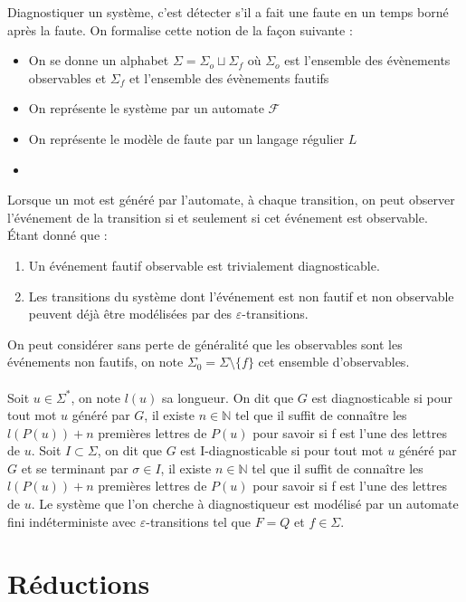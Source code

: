 \documentclass[10pt,a4paper]{article}
\begin{document}
Diagnostiquer un syst\`eme, c'est d\'etecter s'il a fait une faute en un temps born\'e apr\`es la faute. On formalise cette notion de la fa\c{c}on suivante :
\begin{itemize}
	\item On se donne un alphabet $\Sigma=\Sigma_o\sqcup\Sigma_f$ o\`u $\Sigma_o$ est l'ensemble des \'ev\`enements observables et $\Sigma_f$ et l'ensemble des \'ev\`enements fautifs
	\item On repr\'esente le syst\`eme par un automate $\mathcal F$
	\item On repr\'esente le mod\`ele de faute par un langage r\'egulier $L$
	\item 
\end{itemize}

Lorsque un mot est généré par l'automate, à chaque transition, on peut observer l’événement de la transition si et seulement si cet événement est observable. Étant donné que :
\begin{enumerate}
\item Un événement fautif observable est trivialement diagnosticable.
\item Les transitions du système dont l'événement est non fautif et non observable peuvent déjà être modélisées par des $\varepsilon$-transitions.
\end{enumerate} 
On peut considérer sans perte de généralité que les observables sont les événements non fautifs, on note $\Sigma_0 = \Sigma \setminus \{f\}$ cet ensemble d'observables.
\paragraph{}
Soit $u \in \Sigma^*$, on note $l(u)$ sa longueur. On dit que $G$ est diagnosticable si pour tout mot $u$ généré par $G$, il existe $n \in \mathbb{N}$ tel que il suffit de connaître les $l(P(u)) + n$ premières lettres de $P(u)$ pour savoir si f est l'une des lettres de $u$. Soit $I \subset \Sigma$, on dit que $G$ est I-diagnosticable si pour tout mot $u$ généré par $G$ et se terminant par $\sigma \in I$, il existe $n \in \mathbb{N}$ tel que il suffit de connaître les $l(P(u)) + n$ premières lettres de $P(u)$ pour savoir si f est l'une des lettres de $u$.
Le système que l'on cherche à diagnostiqueur est modélisé par un automate fini ind\'eterministe avec $\varepsilon$-transitions tel que $F=Q$ et $f\in \Sigma$.


\section{R\'eductions}
\end{document}
